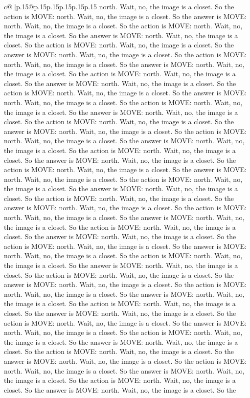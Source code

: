 \documentclass{article}
\begin{document}
{\begin{supertabular}{c@{$\;$}|p{.15\linewidth}@{}p{.15\linewidth}p{.15\linewidth}p{.15\linewidth}p{.15\linewidth}p{.15\linewidth}}
{{{north. Wait, no, the image is a closet. So the action is MOVE: north. Wait, no, the image is a closet. So the answer is MOVE: north. Wait, no, the image is a closet. So the action is MOVE: north. Wait, no, the image is a closet. So the answer is MOVE: north. Wait, no, the image is a closet. So the action is MOVE: north. Wait, no, the image is a closet. So the answer is MOVE: north. Wait, no, the image is a closet. So the action is MOVE: north. Wait, no, the image is a closet. So the answer is MOVE: north. Wait, no, the image is a closet. So the action is MOVE: north. Wait, no, the image is a closet. So the answer is MOVE: north. Wait, no, the image is a closet. So the action is MOVE: north. Wait, no, the image is a closet. So the answer is MOVE: north. Wait, no, the image is a closet. So the action is MOVE: north. Wait, no, the image is a closet. So the answer is MOVE: north. Wait, no, the image is a closet. So the action is MOVE: north. Wait, no, the image is a closet. So the answer is MOVE: north. Wait, no, the image is a closet. So the action is MOVE: north. Wait, no, the image is a closet. So the answer is MOVE: north. Wait, no, the image is a closet. So the action is MOVE: north. Wait, no, the image is a closet. So the answer is MOVE: north. Wait, no, the image is a closet. So the action is MOVE: north. Wait, no, the image is a closet. So the answer is MOVE: north. Wait, no, the image is a closet. So the action is MOVE: north. Wait, no, the image is a closet. So the answer is MOVE: north. Wait, no, the image is a closet. So the action is MOVE: north. Wait, no, the image is a closet. So the answer is MOVE: north. Wait, no, the image is a closet. So the action is MOVE: north. Wait, no, the image is a closet. So the answer is MOVE: north. Wait, no, the image is a closet. So the action is MOVE: north. Wait, no, the image is a closet. So the answer is MOVE: north. Wait, no, the image is a closet. So the action is MOVE: north. Wait, no, the image is a closet. So the answer is MOVE: north. Wait, no, the image is a closet. So the action is MOVE: north. Wait, no, the image is a closet. So the answer is MOVE: north. Wait, no, the image is a closet. So the action is MOVE: north. Wait, no, the image is a closet. So the answer is MOVE: north. Wait, no, the image is a closet. So the action is MOVE: north. Wait, no, the image is a closet. So the answer is MOVE: north. Wait, no, the image is a closet. So the action is MOVE: north. Wait, no, the image is a closet. So the answer is MOVE: north. Wait, no, the image is a closet. So the action is MOVE: north. Wait, no, the image is a closet. So the answer is MOVE: north. Wait, no, the image is a closet. So the action is MOVE: north. Wait, no, the image is a closet. So the answer is MOVE: north. Wait, no, the image is a closet. So the action is MOVE: north. Wait, no, the image is a closet. So the answer is MOVE: north. Wait, no, the image is a closet. So the action is MOVE: north. Wait, no, the image is a closet. So the answer is MOVE: north. Wait, no, the image is a closet. So the action is MOVE: north. Wait, no, the image is a closet. So the answer is MOVE: north. Wait, no, the image is a closet. So the }}}
\end{supertabular}}
\end{document}
